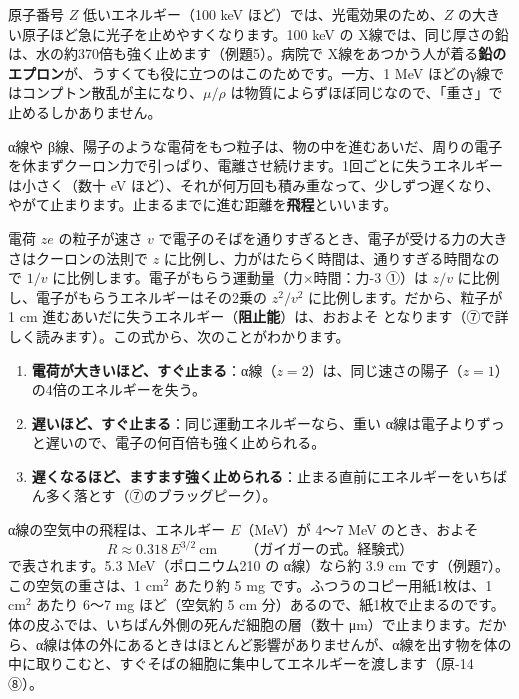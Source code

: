 \begin{phbaisuru}[大きく]{原子番号 $Z$}
低いエネルギー（100 keV ほど）では、光電効果のため、$Z$ の大きい原子ほど急に光子を止めやすくなります。100 keV の X線では、同じ厚さの鉛は、水の約370倍も強く止めます（例題5）。病院で X線をあつかう人が着る\textbf{鉛のエプロン}が、うすくても役に立つのはこのためです。一方、1 MeV ほどのγ線ではコンプトン散乱が主になり、$\mu/\rho$ は物質によらずほぼ同じなので、「重さ」で止めるしかありません。
\end{phbaisuru}

\label{ph:原-13:sec5}
α線や β線、陽子のような電荷をもつ粒子は、物の中を進むあいだ、周りの電子を休まずクーロン力で引っぱり、電離させ続けます。1回ごとに失うエネルギーは小さく（数十 eV ほど）、それが何万回も積み重なって、少しずつ遅くなり、やがて止まります。止まるまでに進む距離を\textbf{飛程}といいます。

電荷 $ze$ の粒子が速さ $v$ で電子のそばを通りすぎるとき、電子が受ける力の大きさはクーロンの法則で $z$ に比例し、力がはたらく時間は、通りすぎる時間なので $1/v$ に比例します。電子がもらう運動量（力×時間：力-3 ①）は $z/v$ に比例し、電子がもらうエネルギーはその2乗の $z^2/v^2$ に比例します。だから、粒子が 1 cm 進むあいだに失うエネルギー（\textbf{阻止能}）は、おおよそ
となります（⑦で詳しく読みます）。この式から、次のことがわかります。
\begin{enumerate}[label={\bkcircled{\arabic*}}, leftmargin=2.4\zw, itemsep=1pt, topsep=2pt]
\item \textbf{電荷が大きいほど、すぐ止まる}：α線（$z=2$）は、同じ速さの陽子（$z=1$）の4倍のエネルギーを失う。
\item \textbf{遅いほど、すぐ止まる}：同じ運動エネルギーなら、重い α線は電子よりずっと遅いので、電子の何百倍も強く止められる。
\item \textbf{遅くなるほど、ますます強く止められる}：止まる直前にエネルギーをいちばん多く落とす（⑦のブラッグピーク）。
\end{enumerate}

α線の空気中の飛程は、エネルギー $E$（MeV）が 4〜7 MeV のとき、およそ
\[ R\approx0.318\,E^{3/2}\ \text{cm}\qquad\text{（ガイガーの式。経験式）} \]
で表されます。5.3 MeV（ポロニウム210 の α線）なら約 3.9 cm です（例題7）。この空気の重さは、1 cm$^2$ あたり約 5 mg です。ふつうのコピー用紙1枚は、1 cm$^2$ あたり 6〜7 mg ほど（空気約 5 cm 分）あるので、紙1枚で止まるのです。体の皮ふでは、いちばん外側の死んだ細胞の層（数十 \si{\micro m}）で止まります。だから、α線は体の外にあるときはほとんど影響がありませんが、α線を出す物を体の中に取りこむと、すぐそばの細胞に集中してエネルギーを渡します（原-14 ⑧）。

